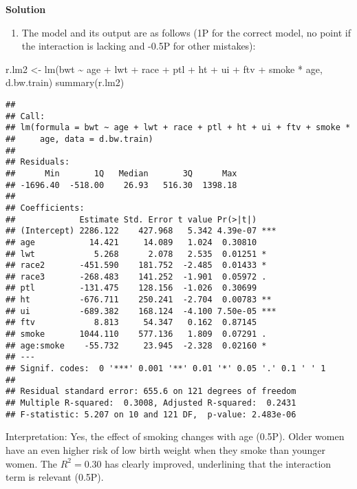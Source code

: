 \documentclass[
]{article}
\newenvironment{Shaded}{\begin{snugshade}}{\end{snugshade}}
\newcommand{\FunctionTok}[1]{\textcolor[rgb]{0.00,0.00,0.00}{#1}}
\newcommand{\NormalTok}[1]{#1}
\newcommand{\OtherTok}[1]{\textcolor[rgb]{0.56,0.35,0.01}{#1}}
\newcommand{\SpecialCharTok}[1]{\textcolor[rgb]{0.00,0.00,0.00}{#1}}
\providecommand{\tightlist}{%
  \setlength{\itemsep}{0pt}\setlength{\parskip}{0pt}}
\begin{document}
\textbf{Solution}

\begin{enumerate}
\def\labelenumi{(\roman{enumi})}
\tightlist
\item
  The model and its output are as follows (1P for the correct model, no
  point if the interaction is lacking and -0.5P for other mistakes):
\end{enumerate}

\begin{Shaded}
\begin{Highlighting}[]
\NormalTok{r.lm2 }\OtherTok{\textless{}{-}} \FunctionTok{lm}\NormalTok{(bwt }\SpecialCharTok{\textasciitilde{}}\NormalTok{ age }\SpecialCharTok{+}\NormalTok{ lwt }\SpecialCharTok{+}\NormalTok{ race }\SpecialCharTok{+}\NormalTok{ ptl }\SpecialCharTok{+}\NormalTok{ ht }\SpecialCharTok{+}\NormalTok{ ui }\SpecialCharTok{+}\NormalTok{ ftv }\SpecialCharTok{+}\NormalTok{ smoke }\SpecialCharTok{*}\NormalTok{ age,}
\NormalTok{    d.bw.train)}
\FunctionTok{summary}\NormalTok{(r.lm2)}
\end{Highlighting}
\end{Shaded}

\begin{verbatim}
## 
## Call:
## lm(formula = bwt ~ age + lwt + race + ptl + ht + ui + ftv + smoke * 
##     age, data = d.bw.train)
## 
## Residuals:
##      Min       1Q   Median       3Q      Max 
## -1696.40  -518.00    26.93   516.30  1398.18 
## 
## Coefficients:
##             Estimate Std. Error t value Pr(>|t|)    
## (Intercept) 2286.122    427.968   5.342 4.39e-07 ***
## age           14.421     14.089   1.024  0.30810    
## lwt            5.268      2.078   2.535  0.01251 *  
## race2       -451.590    181.752  -2.485  0.01433 *  
## race3       -268.483    141.252  -1.901  0.05972 .  
## ptl         -131.475    128.156  -1.026  0.30699    
## ht          -676.711    250.241  -2.704  0.00783 ** 
## ui          -689.382    168.124  -4.100 7.50e-05 ***
## ftv            8.813     54.347   0.162  0.87145    
## smoke       1044.110    577.136   1.809  0.07291 .  
## age:smoke    -55.732     23.945  -2.328  0.02160 *  
## ---
## Signif. codes:  0 '***' 0.001 '**' 0.01 '*' 0.05 '.' 0.1 ' ' 1
## 
## Residual standard error: 655.6 on 121 degrees of freedom
## Multiple R-squared:  0.3008, Adjusted R-squared:  0.2431 
## F-statistic: 5.207 on 10 and 121 DF,  p-value: 2.483e-06
\end{verbatim}

Interpretation: Yes, the effect of smoking changes with age (0.5P).
Older women have an even higher risk of low birth weight when they smoke
than younger women. The \(R^2=0.30\) has clearly improved, underlining
that the interaction term is relevant (0.5P).
\end{document}
